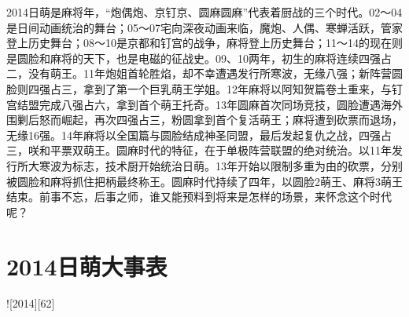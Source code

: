 2014日萌是麻将年，“炮偶炮、京钉京、圆麻圆麻”代表着厨战的三个时代。02～04是日间动画统治的舞台；05～07宅向深夜动画来临，魔炮、人偶、寒蝉活跃，管家登上历史舞台；08～10是京都和钉宫的战争，麻将登上历史舞台；11～14的现在则是圆脸和麻将的天下，也是电磁的征战史。09、10两年，初生的麻将连续四强占二，没有萌王。11年炮姐首轮胜焰，却不幸遭遇发行所寒波，无缘八强；新阵营圆脸则四强占三，拿到了第一个巨乳萌王学姐。12年麻将以阿知贺篇卷土重来，与钉宫结盟完成八强占六，拿到首个萌王托奇。13年圆麻首次同场竞技，圆脸遭遇海外围剿后怒而崛起，再次四强占三，粉圆拿到首个复活萌王；麻将遭到砍票而退场，无缘16强。14年麻将以全国篇与圆脸结成神圣同盟，最后发起复仇之战，四强占三，咲和平票双萌王。圆麻时代的特征，在于单极阵营联盟的绝对统治。以11年发行所大寒波为标志，技术厨开始统治日萌。13年开始以限制多重为由的砍票，分别被圆脸和麻将抓住把柄最终称王。圆麻时代持续了四年，以圆脸2萌王、麻将3萌王结束。前事不忘，后事之师，谁又能预料到将来是怎样的场景，来怀念这个时代呢？

\section*{2014日萌大事表}

![2014][62]

